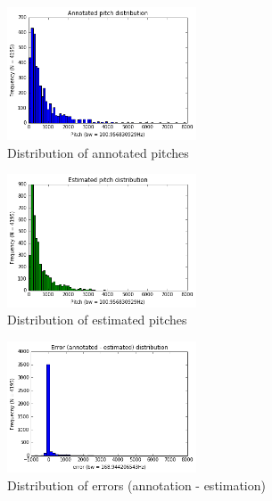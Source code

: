 \documentclass{proc}
\begin{document}
\begin{figure}
    \centering
    \includegraphics[width=0.5\textwidth]{img/pTag_distribution.png}
    \caption{Distribution of annotated pitches}
    \label{fig:pTag_distr}
\end{figure}
\begin{figure}
    \centering
    \includegraphics[width=0.5\textwidth]{img/pEst_distribution.png}
    \caption{Distribution of estimated pitches}
    \label{fig:pEst_distr}
\end{figure}
\begin{figure}
    \centering
    \includegraphics[width=0.5\textwidth]{img/err_distribution.png}
    \caption{Distribution of errors (annotation - estimation)}
    \label{fig:err_distr}
\end{figure}
\end{document}
